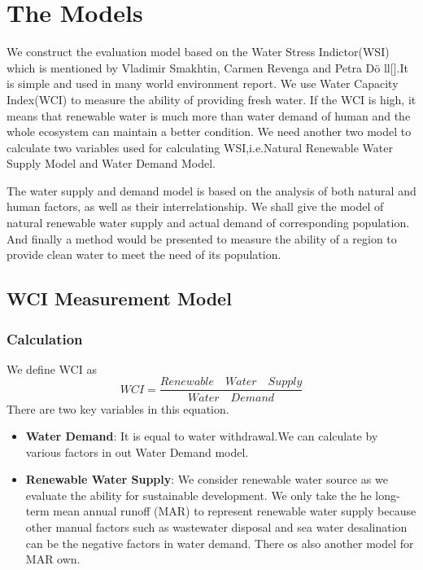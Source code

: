 \documentclass{mcmthesis}
\begin{document}
\section{The Models}
We construct the evaluation model based on the Water Stress Indictor(WSI) which is mentioned by Vladimir Smakhtin, Carmen Revenga and Petra D{\"o} ll[].It is simple and used in many world environment report. We use Water Capacity Index(WCI) to measure the ability of providing fresh water. If the WCI is high, it means that renewable water is much more than water demand of human and the whole ecosystem can maintain a better condition. We need another two model to calculate two variables used for calculating WSI,i.e.Natural Renewable Water Supply Model and Water Demand Model.
 
The water supply and demand model is based on the analysis of both natural and human factors, as well as their interrelationship. We shall give the model of natural renewable water supply and actual demand of corresponding population. And finally a method would be presented to measure the ability of a region to provide clean water to meet the need of its population. 
\subsection{WCI Measurement Model}
\subsubsection{Calculation}
We define WCI as $$WCI=\frac{Renewable\quad Water\quad Supply}{Water\quad Demand}$$
There are two key variables in this equation.
\begin{itemize}
\item
\textbf{Water Demand}:  It is equal to water withdrawal.We can calculate by various factors in out Water Demand model.
\item \textbf{Renewable Water Supply}:  We consider renewable water source as we evaluate the ability for sustainable development. We only take the he long-term mean annual runoff (MAR) to represent renewable water supply because other manual factors such as wastewater disposal and sea water desalination can be the negative factors in water demand. There os also another model for MAR own.
\end{itemize}
\end{document}
